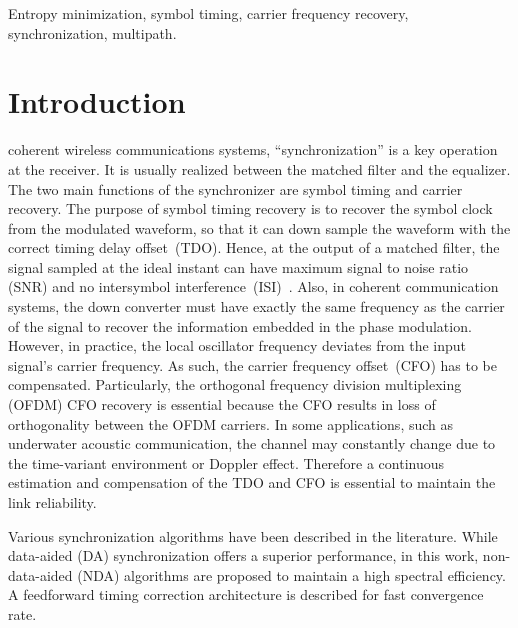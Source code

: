 \documentclass[12pt, draftclsnofoot, onecolumn]{IEEEtran}
\begin{document}
\begin{IEEEkeywords}
Entropy minimization, symbol timing, carrier frequency recovery, synchronization, multipath.
\end{IEEEkeywords}

\IEEEpeerreviewmaketitle

\section{Introduction}
\label{sec:intro}
 coherent wireless communications systems, ``synchronization'' is a key operation at the receiver.
It is usually realized between the matched filter and the equalizer.
The two main functions of the synchronizer are symbol timing and carrier recovery.
The purpose of symbol timing recovery is to recover the symbol clock from the modulated waveform, so that it can down sample the waveform with the correct timing delay offset~(TDO).
Hence, at the output of a matched filter, the signal sampled at the ideal instant can have maximum signal to noise ratio (SNR) and no intersymbol interference~(ISI)~\cite{mengali1997synchronization}.
Also, in coherent communication systems, the down converter must have exactly the same frequency as the carrier of the signal to recover the information embedded in the phase modulation. 
However, in practice, the local oscillator frequency deviates from the input signal's carrier frequency. 
As such, the carrier frequency offset~(CFO) has to be compensated. 
Particularly, the orthogonal frequency division multiplexing (OFDM) CFO recovery is essential because the CFO results in loss of orthogonality between the OFDM carriers.
In some applications, such as underwater acoustic communication, the channel may constantly change due to the time-variant environment or Doppler effect. 
Therefore a continuous estimation and compensation of the TDO and CFO is essential to maintain the link reliability.

Various synchronization algorithms have been described in the literature.
While data-aided (DA) synchronization offers a superior performance, in this work, non-data-aided (NDA) algorithms are proposed to maintain a high spectral efficiency.
A feedforward timing correction architecture is described for fast convergence rate. 
\end{document}

